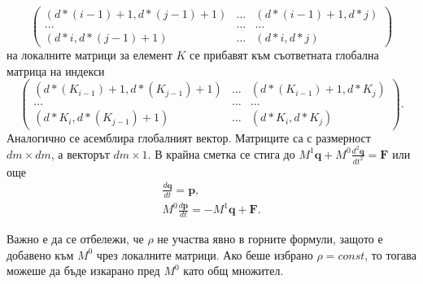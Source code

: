 \documentclass{report}
\begin{document}
	\[
	\begin{pmatrix}
		(d*(i-1)+1, d*(j-1) + 1) & \dots & (d*(i-1)+1, d*j) \\
		\dots & \dots & \dots\\
		(d*i, d*(j-1)+1) & \dots & (d*i, d*j)
	\end{pmatrix}
	\]
	на локалните матрици за елемент $K$ се прибавят към съответната глобална матрица на индекси
	\[
	\begin{pmatrix}
		(d*(K_{i-1})+1, d*(K_{j-1}) + 1) & \dots & (d*(K_{i-1})+1, d*K_j) \\
		\dots & \dots & \dots\\
		(d*K_i, d*(K_{j-1})+1) & \dots & (d*K_i, d*K_j)
	\end{pmatrix}.
	\]
	Аналогично се асемблира глобалният вектор. Матриците са с размерност $dm \times dm$, а векторът $dm \times 1$. В крайна сметка се стига до $\displaystyle M^1\mathbf{q}+ M^0\frac{d^2 \mathbf{q}}{dt^2}=\mathbf{F}$ или още
	\begin{align*}
		\frac{d \mathbf{q}}{dt}=\mathbf{p},\\
		M^0\frac{d \mathbf{p}}{dt}=-M^1\mathbf{q}+\mathbf{F}.
	\end{align*}
	
	Важно е да се отбележи, че $\rho$ не участва явно в горните формули, защото е добавено към $M^0$ чрез локалните матрици. Ако беше избрано $\rho=const$, то тогава можеше да бъде изкарано пред $M^0$ като общ множител.
	
\end{document}
